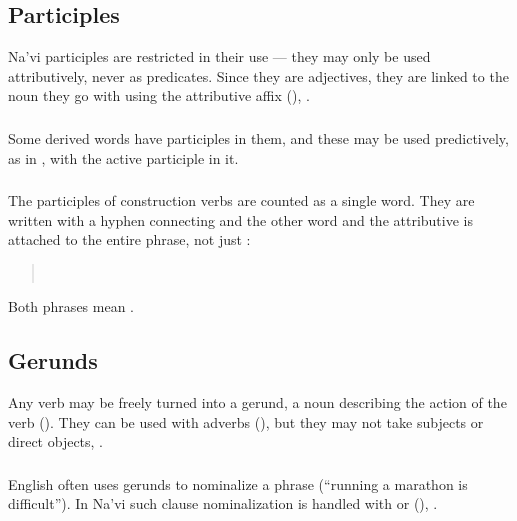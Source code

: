 \subsection{Participles} 
Na'vi participles are restricted in their use --- they may only be
used attribu\-ti\-vely, never as predicates.  Since they are adjectives,
they are linked to the noun they go with using the attributive affix
 (),  .\label{syn:part:attr}

\subsubsection{} Some derived words have participles in them, and
these may be used predictively, as in 
, with the active participle  in it.

\subsubsection{} The participles of  construction verbs are
counted as a single word.  They are written with a hyphen connecting
 and the other word and the attributive  is attached to the
entire phrase, not just : \label{syn:participle:si-const}

\begin{quotation}
\noindent{}\\
\noindent{}
\end{quotation}

\noindent Both phrases mean .

\subsection{Gerunds} Any verb may be freely turned into a gerund, a
noun describing the action of the verb ().
They can be used with adverbs (),
but they may not take subjects or direct objects,  .\label{syn:gerund}

\subsubsection{} English often uses gerunds to nominalize a phrase
(``running a mara\-thon is difficult'').  In Na'vi such clause
nominalization is handled with  or  
(), 
.


